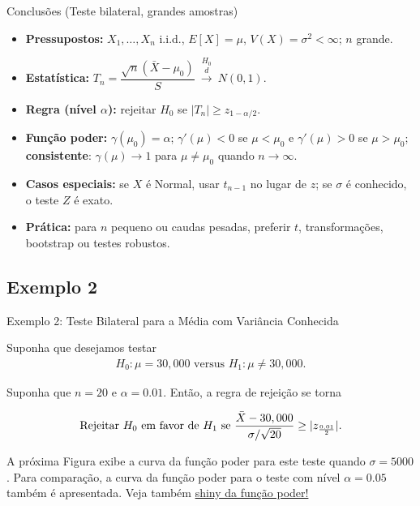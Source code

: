 \documentclass[12pt]{beamer}
\begin{document}
\begin{frame}{Conclusões (Teste bilateral, grandes amostras)}
	\begin{block}{}
		\justifying
		\begin{itemize}
			\item \textbf{Pressupostos:} $X_1,\ldots,X_n$ i.i.d., $E[X]=\mu$, $V(X)=\sigma^2<\infty$; $n$ grande.
			\item \textbf{Estatística:} $T_n=\dfrac{\sqrt{n}(\bar X-\mu_0)}{S}\ \overset{H_0}{\xrightarrow{d}}\ N(0,1)$.
			\item \textbf{Regra (nível $\alpha$):} rejeitar $H_0$ se $|T_n|\ge z_{1-\alpha/2}$.\\
			\item \textbf{Função poder:} $\gamma(\mu_0)=\alpha$; $\gamma'(\mu)<0$ se $\mu<\mu_0$ e $\gamma'(\mu)>0$ se $\mu>\mu_0$; \textbf{consistente}: $\gamma(\mu)\to1$ para $\mu\neq\mu_0$ quando $n\to\infty$.
			\item \textbf{Casos especiais:} se $X$ é Normal, usar $t_{n-1}$ no lugar de $z$; se $\sigma$ é conhecido, o teste $Z$ é exato.
			\item \textbf{Prática:} para $n$ pequeno ou caudas pesadas, preferir $t$, transformações, bootstrap ou testes robustos.
		\end{itemize}
	\end{block}
\end{frame}


\subsection{Exemplo 2}
\begin{frame}{Exemplo 2: Teste Bilateral para a Média com Variância Conhecida}
\begin{block}{}
\justifying
Suponha que desejamos testar
\begin{align}
H_0 : \mu = 30,000 \text{ versus } H_1 : \mu \neq 30,000. 
\end{align}

Suponha que $n = 20$ e $\alpha = 0.01$. Então, a regra de rejeição se torna

\begin{align}
\text{Rejeitar } H_0 \text{ em favor de } H_1 \text{ se } \frac{\Bar{X} - 30,000}{\sigma/\sqrt{20}} \geq |z_{\frac{0.01}{2}}|.
\end{align}

A próxima Figura exibe a curva da função poder para este teste quando $\sigma = 5000$. Para comparação, a curva da função poder para o teste com nível $\alpha = 0.05$ também é apresentada. Veja também \href{https://est711.shinyapps.io/FuncaoPoder/}{shiny da função poder!}
\end{block}
\end{frame}
\end{document}
